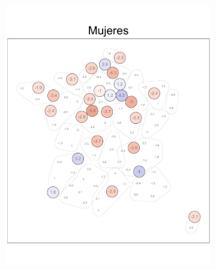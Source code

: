 \begin{figure}
\begin{subfigure}{0.275\textwidth}
	\includegraphics[width = \textwidth]{Figs/Efectos/Dorling_Efectos_Muj_Modelo_H}
	\end{subfigure}
	~
	\begin{subfigure}{0.275\textwidth}

\end{subfigure}
\end{figure}
